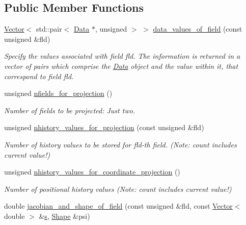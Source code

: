 \subsection*{Public Member Functions}
\begin{DoxyCompactItemize}
\item 
\hyperlink{classoomph_1_1Vector}{Vector}$<$ std\+::pair$<$ \hyperlink{classoomph_1_1Data}{Data} $\ast$, unsigned $>$ $>$ \hyperlink{classoomph_1_1ProjectableFoepplvonKarmanElement_a945d9f6e4fe913ca3659b0aceaab9b94}{data\+\_\+values\+\_\+of\+\_\+field} (const unsigned \&fld)
\begin{DoxyCompactList}\small\item\em Specify the values associated with field fld. The information is returned in a vector of pairs which comprise the \hyperlink{classoomph_1_1Data}{Data} object and the value within it, that correspond to field fld. \end{DoxyCompactList}\item 
unsigned \hyperlink{classoomph_1_1ProjectableFoepplvonKarmanElement_aaa74e7c246f86929e7ceeeced8819d6c}{nfields\+\_\+for\+\_\+projection} ()
\begin{DoxyCompactList}\small\item\em Number of fields to be projected\+: Just two. \end{DoxyCompactList}\item 
unsigned \hyperlink{classoomph_1_1ProjectableFoepplvonKarmanElement_afbac2a4519a482c9a7fdc9994e783147}{nhistory\+\_\+values\+\_\+for\+\_\+projection} (const unsigned \&fld)
\begin{DoxyCompactList}\small\item\em Number of history values to be stored for fld-\/th field. (Note\+: count includes current value!) \end{DoxyCompactList}\item 
unsigned \hyperlink{classoomph_1_1ProjectableFoepplvonKarmanElement_a7b6ce72f267669ecd5fc0119f669772f}{nhistory\+\_\+values\+\_\+for\+\_\+coordinate\+\_\+projection} ()
\begin{DoxyCompactList}\small\item\em Number of positional history values (Note\+: count includes current value!) \end{DoxyCompactList}\item 
double \hyperlink{classoomph_1_1ProjectableFoepplvonKarmanElement_a1fd58ba72daf96c1849cb48350684d74}{jacobian\+\_\+and\+\_\+shape\+\_\+of\+\_\+field} (const unsigned \&fld, const \hyperlink{classoomph_1_1Vector}{Vector}$<$ double $>$ \&\hyperlink{cfortran_8h_ab7123126e4885ef647dd9c6e3807a21c}{s}, \hyperlink{classoomph_1_1Shape}{Shape} \&psi)

\end{DoxyCompactItemize}
